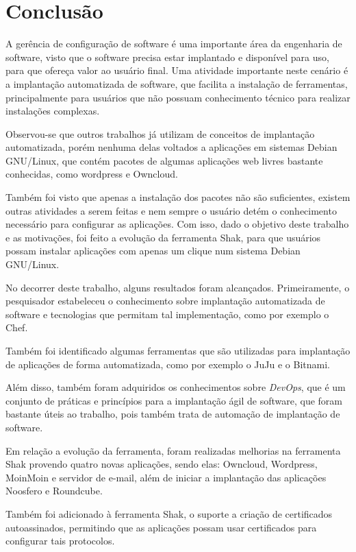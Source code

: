 \chapter{Conclusão}
\label{cap-conclusoes}

A gerência de configuração de software é uma importante área da engenharia de software,
visto que o software precisa estar implantado e disponível para uso, para que ofereça
valor ao usuário final. Uma atividade importante neste cenário é a implantação
automatizada de software, que facilita a instalação de ferramentas, principalmente
para usuários que não possuam conhecimento técnico para realizar instalações complexas.

Observou-se que outros trabalhos já utilizam de conceitos de implantação automatizada,
porém nenhuma delas voltados a aplicações em sistemas Debian GNU/Linux, que contém
pacotes de algumas aplicações web livres bastante conhecidas, como wordpress e
Owncloud. 

Também foi visto que apenas a instalação dos pacotes não são suficientes,
existem outras atividades a serem feitas e nem sempre o usuário detém
o conhecimento necessário para configurar as aplicações. Com isso, dado o objetivo
deste trabalho e as motivações, foi feito a evolução da ferramenta Shak, para
que usuários possam instalar aplicações com apenas um clique num sistema Debian
GNU/Linux.

No decorrer deste trabalho, alguns resultados foram alcançados. Primeiramente, o
pesquisador estabeleceu o conhecimento sobre implantação automatizada
de software e tecnologias que permitam tal implementação, como por exemplo o Chef.

Também foi identificado algumas ferramentas que são
utilizadas para implantação de aplicações de forma automatizada, como por exemplo
o JuJu e o Bitnami.

Além disso, também foram adquiridos os conhecimentos sobre \textit{DevOps}, que é um conjunto
de práticas e princípios para a implantação ágil de software, que foram bastante
úteis ao trabalho, pois também trata de automação de implantação de software.
 
Em relação a evolução da ferramenta, foram realizadas melhorias na ferramenta Shak
provendo quatro novas aplicações, sendo elas: Owncloud, Wordpress, MoinMoin e
servidor de e-mail, além de iniciar a implantação das aplicações Noosfero e Roundcube. 

Também foi adicionado à ferramenta Shak, o suporte a criação de certificados autoassinados, 
permitindo que as aplicações possam usar certificados para configurar tais protocolos. 


